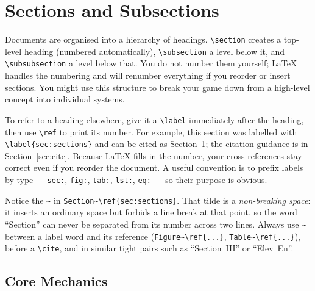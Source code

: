\documentclass[a4paper,twoside,twocolumn]{IEEEtran}
\begin{document}

\section{Sections and Subsections}
\label{sec:sections}

Documents are organised into a hierarchy of headings. \verb|\section| creates a
top-level heading (numbered automatically), \verb|\subsection| a level below it,
and \verb|\subsubsection| a level below that. You do not number them yourself;
LaTeX handles the numbering and will renumber everything if you reorder or insert
sections. You might use this structure to break your game down from a high-level
concept into individual systems.

To refer to a heading elsewhere, give it a \verb|\label| immediately after the
heading, then use \verb|\ref| to print its number. For example, this section was
labelled with \verb|\label{sec:sections}| and can be cited as
Section~\ref{sec:sections}; the citation guidance is in
Section~\ref{sec:cite}. Because LaTeX fills in the number, your cross-references
stay correct even if you reorder the document. A useful convention is to prefix
labels by type --- \texttt{sec:}, \texttt{fig:}, \texttt{tab:}, \texttt{lst:},
\texttt{eq:} --- so their purpose is obvious.

Notice the \verb|~| in \verb|Section~\ref{sec:sections}|. That tilde is a
\emph{non-breaking space}: it inserts an ordinary space but forbids a line break
at that point, so the word ``Section'' can never be separated from its number
across two lines. Always use \verb|~| between a label word and its reference
(\verb|Figure~\ref{...}|, \verb|Table~\ref{...}|), before a \verb|\cite|, and in
similar tight pairs such as ``Section~III'' or ``Elev~En''.


\subsection{Core Mechanics}
\end{document}
